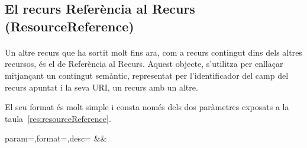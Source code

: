 \subsection{El recurs Referència al Recurs (ResourceReference)}

    \paragraph{}
    Un altre recurs que ha sortit molt fins ara, com a recurs contingut dins dels altres recursos, és el de Referència al Recurs. Aquest objecte, s'utilitza per enllaçar mitjançant un contingut semàntic, representat per l'identificador del camp del recurs apuntat i la seva URI, un recurs amb un altre.

    El seu format és molt simple i consta només dels dos paràmetres exposats a la taula~\ref{res:resourceReference}.

    \begin{center}
             {param=\param,format=\format,desc=\desc}
             {\param&\format&\desc}
     \end{center}
